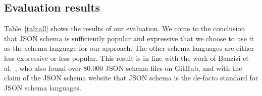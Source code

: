 \subsection{Evaluation results}\label{subsec:evaluation-results}

Table~\ref{tab:all} shows the results of our evaluation.
We come to the conclusion that JSON schema is sufficiently popular and expressive that we choose to use it as the schema language for our approach.
The other schema languages are either less expressive or less popular.
This result is in line with the work of Baazizi et al.~\cite{baazizi2021empirical}, who also found over 80.000 JSON schema files on GitHub,
and with the claim of the JSON schema website\cite{jsonschemaJSONSchema} that JSON schema is the de-facto standard for JSON schema languages.


%
%
